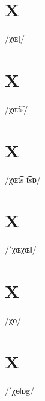 \documentclass[10pt,a4paper,twoside]{book}
\begin{document}
\section*{X}

\begin{multicols}{3}
 {/χɶɭ/} {}
\end{multicols}

\section*{X}

\begin{multicols}{3}
 {/χɶt͡s/} {}
\end{multicols}

\section*{X}

\begin{multicols}{3}
 {/χɶt͡s t͡sɒ/} {}
\end{multicols}

\section*{X}

\begin{multicols}{3}
 {/ˈχɶχɶǁ/} {}
\end{multicols}

\section*{X}

\begin{multicols}{3}
 {/χɵ/} {}
\end{multicols}

\section*{X}

\begin{multicols}{3}
 {/ˈχɵǀɒg/} {}
\end{multicols}
\end{document}
